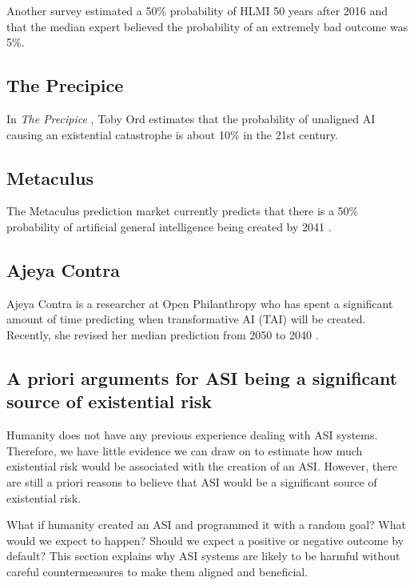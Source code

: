 \documentclass{article}
\begin{document}
Another survey \cite{aiimpactssurvey} estimated a 50\% probability of HLMI 50 years after 2016 and that the median expert believed the probability of an extremely bad outcome was 5\%.

\subsection{The Precipice}

In \textit{The Precipice} \cite{theprecipice}, Toby Ord estimates that the probability of unaligned AI causing an existential catastrophe is about 10\% in the 21st century.

\subsection{Metaculus}

The Metaculus prediction market currently predicts that there is a 50\% probability of artificial general intelligence being created by 2041 \cite{metaculus}.

\subsection{Ajeya Contra}

Ajeya Contra is a researcher at Open Philanthropy who has spent a significant amount of time predicting when transformative AI (TAI) will be created. Recently, she revised her median prediction from 2050 to 2040 \cite{twoyearupdate}.

\subsection{A priori arguments for ASI being a significant source of existential risk}

Humanity does not have any previous experience dealing with ASI systems. Therefore, we have little evidence we can draw on to estimate how much existential risk would be associated with the creation of an ASI. However, there are still a priori reasons to believe that ASI would be a significant source of existential risk\cite{withoutspecificcountermeasures}.

What if humanity created an ASI and programmed it with a random goal? What would we expect to happen? Should we expect a positive or negative outcome by default? This section explains why ASI systems are likely to be harmful without careful countermeasures to make them aligned and beneficial.
\end{document}
